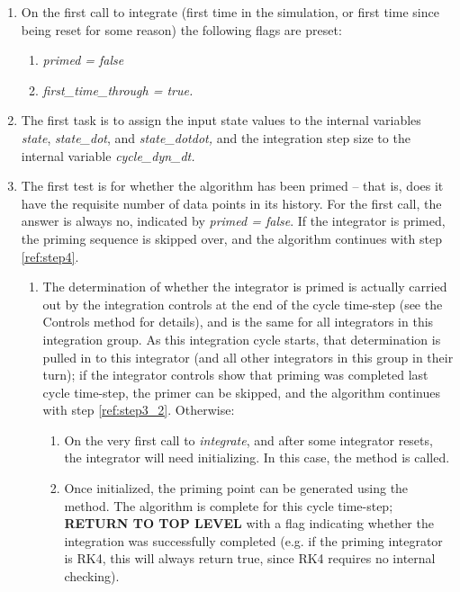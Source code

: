 \begin{enumerate}
\item On the first call to integrate (first time in the simulation, or
first time since being reset for some reason) the following flags are
preset:

 \begin{enumerate}
 \item \textit{primed = false}
 \item \textit{first\_time\_through = true.}

 \end{enumerate}

\item The first task is to assign the input state values to the internal
variables \textit{state}, \textit{state\_dot}, and
\textit{state\_dotdot, }and the integration step size to the internal
variable \textit{cycle\_dyn\_dt.}

\item The first test is for whether the algorithm has been primed --
that is, does it have the requisite number of data points in its
history. For the first call, the answer is always no, indicated by
\textit{primed = false}. If the integrator is primed, the
priming sequence is
skipped over, and the algorithm continues with step \ref{ref:step4}.

\begin{enumerate}
\item The determination of whether the integrator is primed is actually
carried out by the integration controls at the end of the cycle
time-step (see the Controls method
 for details),
and is the same for all integrators in this integration group. As this
integration cycle starts, that determination is pulled in to this
integrator (and all other integrators in this group in their turn); if
the integrator controls show that priming was completed last cycle
time-step, the primer can be skipped, and the algorithm continues with
step \ref{ref:step3_2}.  Otherwise:

\begin{enumerate}
\item On the very first call to \textit{integrate}, and after some integrator
resets, the integrator will need initializing. In this case, the
method 
is called.

\item Once initialized, the priming point can be generated using the
 method.
The algorithm is complete for this
cycle time-step; \textbf{RETURN TO TOP LEVEL} with a flag indicating
whether the integration was successfully completed (e.g. if the priming
integrator is RK4, this will always return true, since RK4 requires no
internal checking).
\end{enumerate}


\end{enumerate}
\end{enumerate}

